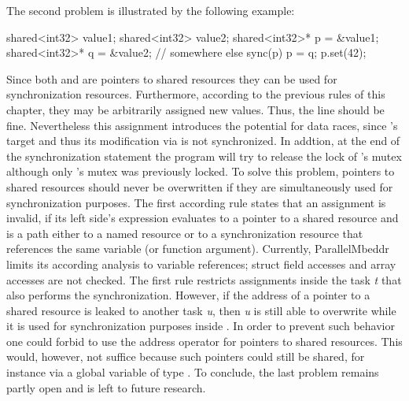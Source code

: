 The second problem is illustrated by the following example:
\begin{ccode}
shared<int32> value1;
shared<int32> value2;
shared<int32>* p = &value1;
shared<int32>* q = &value2;
// somewhere else
sync(p) {
  p = q;
  p.set(42);
}
\end{ccode}
Since both  and  are pointers to shared resources they can be used for synchronization resources. Furthermore, according to the previous rules of this chapter, they may be arbitrarily assigned new values. Thus, the line  should be fine. Nevertheless this assignment introduces the potential for data races, since 's target  and thus its modification via  is not synchronized. In addtion, at the end of the synchronization statement the program will try to release the lock of 's mutex although only 's mutex was previously locked. To solve this problem, pointers to shared resources should never be overwritten if they are simultaneously used for synchronization purposes. The first according rule states that an assignment is invalid, if its left side's expression evaluates to a pointer to a shared resource and is  a path either to a named resource or to a synchronization resource that references the same variable (or function argument). Currently, ParallelMbeddr limits its according analysis to variable references; struct field accesses and array accesses are not checked. The first rule restricts assignments inside the task \textit{t} that also performs the synchronization. However, if the address of a pointer  to a shared resource is leaked to another task \textit{u}, then \textit{u} is still able to overwrite  while it is used for synchronization purposes inside . In order to prevent such behavior one could forbid to use the address operator \CODE{\&} for pointers to shared resources. This would, however, not suffice because such pointers could still be shared, for instance via a global variable of type . To conclude, the last problem remains partly open and is left to future research.